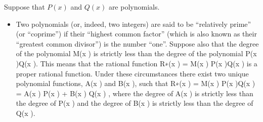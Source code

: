 \documentclass[letterpaper,10pt,english]{jupyterBook}
\begin{document}
\sphinxAtStartPar
Suppose that \(P(x)\) and \(Q(x)\) are  polynomials.
\begin{itemize}
\item {} 
\sphinxAtStartPar
Two polynomials (or, indeed, two integers) are said to be “relatively prime” (or “co\sphinxhyphen{}prime”) if their “highest common factor” (which is also known as their “greatest common divisor”) is the number “one”.
Suppose also that the degree of the polynomial M(x ) is strictly less
than the degree of the polynomial P(x )Q(x ).
This means that the rational function R∗(x ) = M(x )
P(x )Q(x ) is a proper
rational function.
Under these circumstances there exist two unique polynomial
functions, A(x ) and B(x ), such that
R∗(x ) = M(x )
P(x )Q(x ) = A(x )
P(x ) + B(x )
Q(x ) ,
where the degree of A(x ) is strictly less than the degree of P(x ) and
the degree of B(x ) is strictly less than the degree of Q(x ).

\end{itemize}







\renewcommand{\indexname}{Index}
\printindex
\end{document}
